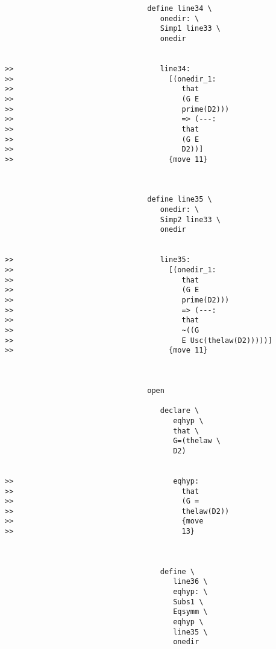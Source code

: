 \documentclass[12pt]{article}
\begin{document}
\begin{verbatim}
                                 define line34 \
                                    onedir: \
                                    Simp1 line33 \
                                    onedir


>>                                  line34:
>>                                    [(onedir_1:
>>                                       that
>>                                       (G E
>>                                       prime(D2)))
>>                                       => (---:
>>                                       that
>>                                       (G E
>>                                       D2))]
>>                                    {move 11}



                                 define line35 \
                                    onedir: \
                                    Simp2 line33 \
                                    onedir


>>                                  line35:
>>                                    [(onedir_1:
>>                                       that
>>                                       (G E
>>                                       prime(D2)))
>>                                       => (---:
>>                                       that
>>                                       ~((G
>>                                       E Usc(thelaw(D2)))))]
>>                                    {move 11}



                                 open

                                    declare \
                                       eqhyp \
                                       that \
                                       G=(thelaw \
                                       D2)


>>                                     eqhyp:
>>                                       that
>>                                       (G =
>>                                       thelaw(D2))
>>                                       {move
>>                                       13}



                                    define \
                                       line36 \
                                       eqhyp: \
                                       Subs1 \
                                       Eqsymm \
                                       eqhyp \
                                       line35 \
                                       onedir



\end{verbatim}
\end{document}

